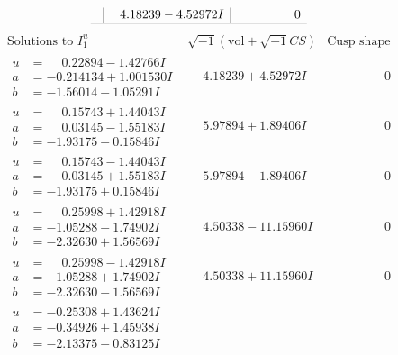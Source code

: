 \documentclass[1p]{elsarticle_modified}
\theoremstyle{definition}
\newcommand{\I}{\sqrt{-1}}
\begin{document}
$$\begin{array}{c|c|c}
 & \phantom{-}4.18239 - 4.52972 I & \phantom{-0.000000 } 0\\
 \hline 
 \end{array}$$\newpage$$\begin{array}{c|c|c}  
\text{Solutions to }I^u_{1}& \I (\text{vol} + \sqrt{-1}CS) & \text{Cusp shape}\\
 \hline 
\begin{aligned}
u &= \phantom{-}0.22894 - 1.42766 I \\
a &= -0.214134 + 1.001530 I \\
b &= -1.56014 - 1.05291 I\end{aligned}
 & \phantom{-}4.18239 + 4.52972 I & \phantom{-0.000000 } 0 \\ \hline\begin{aligned}
u &= \phantom{-}0.15743 + 1.44043 I \\
a &= \phantom{-}0.03145 - 1.55183 I \\
b &= -1.93175 - 0.15846 I\end{aligned}
 & \phantom{-}5.97894 + 1.89406 I & \phantom{-0.000000 } 0 \\ \hline\begin{aligned}
u &= \phantom{-}0.15743 - 1.44043 I \\
a &= \phantom{-}0.03145 + 1.55183 I \\
b &= -1.93175 + 0.15846 I\end{aligned}
 & \phantom{-}5.97894 - 1.89406 I & \phantom{-0.000000 } 0 \\ \hline\begin{aligned}
u &= \phantom{-}0.25998 + 1.42918 I \\
a &= -1.05288 - 1.74902 I \\
b &= -2.32630 + 1.56569 I\end{aligned}
 & \phantom{-}4.50338 - 11.15960 I & \phantom{-0.000000 } 0 \\ \hline\begin{aligned}
u &= \phantom{-}0.25998 - 1.42918 I \\
a &= -1.05288 + 1.74902 I \\
b &= -2.32630 - 1.56569 I\end{aligned}
 & \phantom{-}4.50338 + 11.15960 I & \phantom{-0.000000 } 0 \\ \hline\begin{aligned}
u &= -0.25308 + 1.43624 I \\
a &= -0.34926 + 1.45938 I \\
b &= -2.13375 - 0.83125 I\end{aligned}

\end{array}$$
\end{document}
